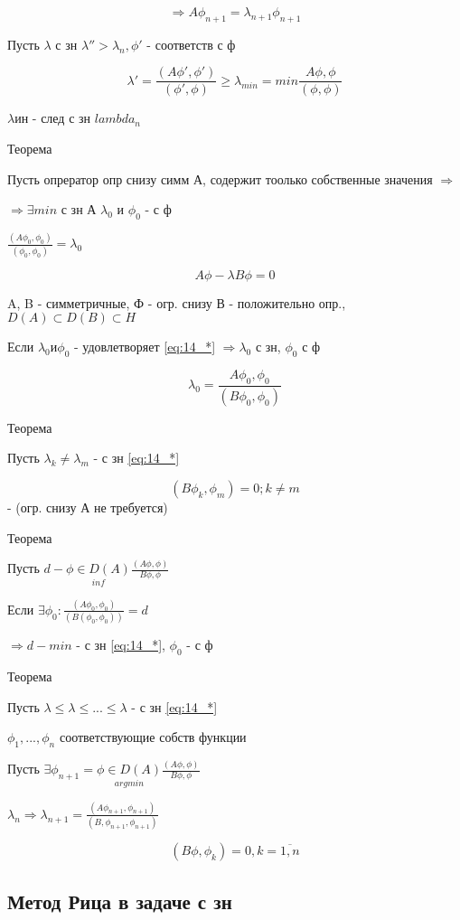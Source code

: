 \documentclass[12pt, a4paper]{article}
\begin{document}
\[ \Rightarrow A \phi_{n+1} = \lambda_{n+1} \phi_{n+1} \]

Пусть $ \lambda $ с зн $ \lambda'' > \lambda_n, \phi' $ - соответств с ф

\[ \lambda' = \frac{(A\phi', \phi')}{(\phi', \phi)} \geq \lambda_{min} = min \frac{A \phi, \phi}{(\phi, \phi)} \]

$ \lambda$ин - след с зн $ lambda_n $

Теорема

Пусть опрератор опр снизу симм А, содержит тоолько собственные значения  $ \Rightarrow $

$ \Rightarrow \exists min  $ с зн А $ \lambda_0 $ и $ \phi_0  $ - с ф

$ \frac{(A\phi_0, \phi_0)}{(\phi_0, \phi_0)} = \lambda_0 $

\[ A \phi - \lambda B \phi = 0 \label{eq:14_*} \]

A, B - симметричные, Ф - огр. снизу
В - положительно опр., $  D(A) \subset D(B) \subset H $

Если $ \lambda_0 и \phi_0 $ - удовлетворяет \ref{eq:14_*} $ \Rightarrow \lambda_0 $ с зн, $ \phi_0 $ с ф

\[ \lambda_0 = \frac{A \phi_0, \phi_0}{(B \phi_0, \phi_0)} \]

Теорема

Пусть $ \lambda_k \neq \lambda_m  $ - с зн \ref{eq:14_*}

\[ (B \phi_k, \phi_m) = 0; k \neq m  \] - (огр. снизу А не требуется)


Теорема

Пусть $ d - \underset{inf}{\phi \in D(A)} \frac{(A \phi, \phi)}{B \phi, \phi} $

Если $ \exists \phi_0: \frac{(A \phi_0, \phi_0)}{(B(\phi_0, \phi_0))} = d $

$ \Rightarrow d - min $ - с зн \ref{eq:14_*}, $ \phi_0 $ - с ф

Теорема

Пусть $ \lambda \leq \lambda \leq ... \leq \lambda $ - с зн \ref{eq:14_*}

$ \phi_1, ... , \phi_n $ соответствующие собств функции

Пусть $ \exists \phi_{n+1} = \underset{argmin}{\phi \in D(A)}\frac{(A \phi, \phi)}{B \phi, \phi} $

$ \lambda_n \Rightarrow \lambda_{n+1} = \frac{(A \phi_{n+1}, \phi_{n+1})}{(B, \phi_{n+1}, \phi_{n+1})} $

\[ (B\phi, \phi_k) = 0, k = \overline{1, n} \]

\subsection{Метод Рица в задаче с зн}
\end{document}
